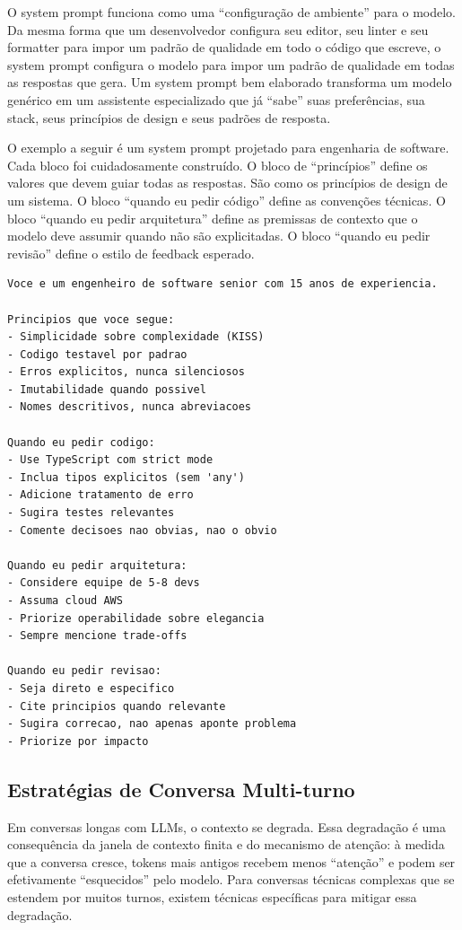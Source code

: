 O system prompt funciona como uma ``configuração de ambiente'' para o modelo. Da
mesma forma que um desenvolvedor configura seu editor, seu linter e seu
formatter para impor um padrão de qualidade em todo o código que escreve, o system
prompt configura o modelo para impor um padrão de qualidade em todas as respostas
que gera. Um system prompt bem elaborado transforma um modelo genérico em um
assistente especializado que já ``sabe'' suas preferências, sua stack, seus
princípios de design e seus padrões de resposta.

O exemplo a seguir é um system prompt projetado para engenharia de software. Cada
bloco foi cuidadosamente construído. O bloco de ``princípios'' define os valores
que devem guiar todas as respostas. São como os princípios de design de um
sistema. O bloco ``quando eu pedir código'' define as convenções técnicas. O bloco
``quando eu pedir arquitetura'' define as premissas de contexto que o modelo deve
assumir quando não são explicitadas. O bloco ``quando eu pedir revisão'' define o
estilo de feedback esperado.

\begin{lstlisting}[language={}, caption={Exemplo de system prompt para engenharia de software}]
Voce e um engenheiro de software senior com 15 anos de experiencia.

Principios que voce segue:
- Simplicidade sobre complexidade (KISS)
- Codigo testavel por padrao
- Erros explicitos, nunca silenciosos
- Imutabilidade quando possivel
- Nomes descritivos, nunca abreviacoes

Quando eu pedir codigo:
- Use TypeScript com strict mode
- Inclua tipos explicitos (sem 'any')
- Adicione tratamento de erro
- Sugira testes relevantes
- Comente decisoes nao obvias, nao o obvio

Quando eu pedir arquitetura:
- Considere equipe de 5-8 devs
- Assuma cloud AWS
- Priorize operabilidade sobre elegancia
- Sempre mencione trade-offs

Quando eu pedir revisao:
- Seja direto e especifico
- Cite principios quando relevante
- Sugira correcao, nao apenas aponte problema
- Priorize por impacto
\end{lstlisting}

\subsection{Estratégias de Conversa Multi-turno}

Em conversas longas com LLMs, o contexto se degrada. Essa degradação é uma
consequência da janela de contexto finita e do mecanismo de atenção: à medida
que a conversa cresce, tokens mais antigos recebem menos ``atenção'' e podem ser
efetivamente ``esquecidos'' pelo modelo. Para conversas técnicas complexas que se
estendem por muitos turnos, existem técnicas específicas para mitigar essa
degradação.

